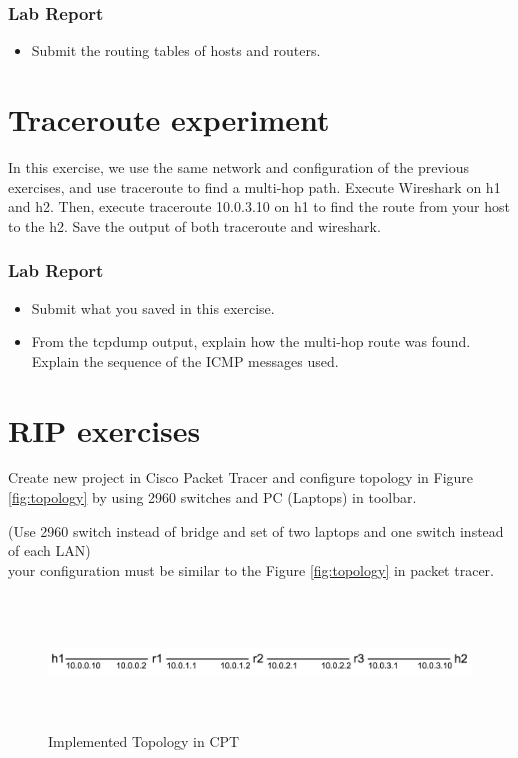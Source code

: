 \documentclass[10pt,a4paper]{article}
\numberwithin{equation}{section}
\numberwithin{figure}{section}
\numberwithin{table}{section}
\begin{document}
  \subsubsection*{ Lab Report}
\begin{itemize}
	\setlength{\itemindent}{0pt}
	\item Submit the routing tables of hosts and routers.
\end{itemize}

\section{Traceroute experiment}
In this exercise, we use the same network and configuration of the previous exercises, and use traceroute to find a multi-hop path.
Execute Wireshark on h1 and h2. Then, execute traceroute 10.0.3.10 on h1 to find the route from your host to the h2. Save the output of both traceroute and wireshark.

\subsubsection*{ Lab Report}
\begin{itemize}
	\setlength{\itemindent}{0pt}
	\item Submit what you saved in this exercise.
	\item From the tcpdump output, explain how the multi-hop route was found. Explain the sequence of the ICMP messages used.
\end{itemize}


\section{RIP exercises}
    Create new project in Cisco Packet Tracer and configure topology in Figure \ref{fig:topology} by using 2960 switches and PC (Laptops) in toolbar.

(Use 2960 switch instead of bridge and set of two laptops and one switch instead of each LAN)\\
your configuration must be similar to the Figure \ref{fig:topology} in packet tracer.

\begin{figure}[H]
	\centering
    \includegraphics[height=100pt]{img/fig2.png}
    \caption{Implemented Topology in CPT}
\end{figure}
\end{document}
